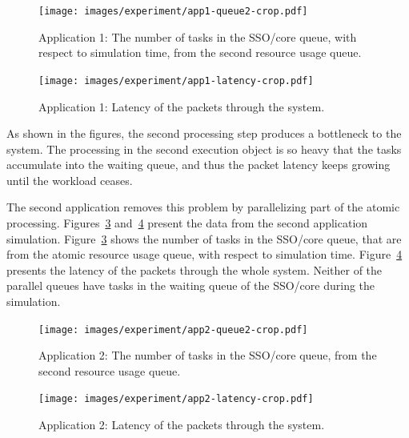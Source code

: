 \begin{figure}[]
  \begin{center}
    \texttt{[image: images/experiment/app1-queue2-crop.pdf]}
    \caption{Application 1: The number of tasks in the SSO/core queue, with respect to simulation time, from the second resource usage queue.}
    \label{fig:app1-queue2}
  \end{center}
\end{figure}

\begin{figure}[]
  \begin{center}
    \texttt{[image: images/experiment/app1-latency-crop.pdf]}
    \caption{Application 1: Latency of the packets through the system.}
    \label{fig:app1-latency}
  \end{center}
\end{figure}

As shown in the figures, the second processing step produces a bottleneck to the system. The processing in the second execution object is so heavy that the tasks accumulate into the waiting queue, and thus the packet latency keeps growing until the workload ceases.

The second application removes this problem by parallelizing part of the atomic processing. Figures~\ref{fig:app2-queue2} and~\ref{fig:app2-latency} present the data from the second application simulation. Figure~\ref{fig:app2-queue2} shows the number of tasks in the SSO/core queue, that are from the atomic resource usage queue, with respect to simulation time. Figure~\ref{fig:app2-latency} presents the latency of the packets through the whole system. Neither of the parallel queues have tasks in the waiting queue of the SSO/core during the simulation.

\begin{figure}[]
  \begin{center}
    \texttt{[image: images/experiment/app2-queue2-crop.pdf]}
    \caption{Application 2: The number of tasks in the SSO/core queue, from the second resource usage queue.}
    \label{fig:app2-queue2}
  \end{center}
\end{figure}

\begin{figure}[]
  \begin{center}
    \texttt{[image: images/experiment/app2-latency-crop.pdf]}
    \caption{Application 2: Latency of the packets through the system.}
    \label{fig:app2-latency}
  \end{center}
\end{figure}

